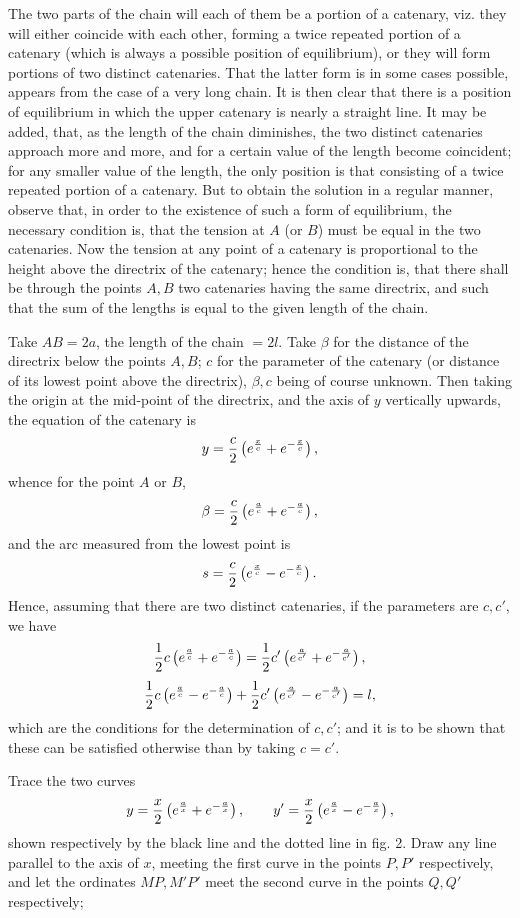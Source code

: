 \documentclass[11pt,a4paper]{article}
\theoremstyle{plain}
\theoremstyle{definition}
\begin{document}
The two parts of the chain will each of them be a portion of a catenary, viz. they will either coincide with each other, forming a twice repeated portion of a catenary (which is always a possible position of equilibrium), or they will form portions of two distinct catenaries. That the latter form is in some cases possible, appears from the case of a very long chain. It is then clear that there is a position of equilibrium in which the upper catenary is nearly a straight line. It may be added, that, as the length of the chain diminishes, the two distinct catenaries approach more and more, and for a certain value of the length become coincident; for any smaller value of the length, the only position is that consisting of a twice repeated portion of a catenary. But to obtain the solution in a regular manner, observe that, in order to the existence of such a form of equilibrium, the necessary condition is, that the tension at $A$ (or $B$) must be equal in the two catenaries. Now the tension at any point of a catenary is proportional to the height above the directrix of the catenary; hence the condition is, that there shall be through the points $A,B$ two catenaries having the same directrix, and such that the sum of the lengths is equal to the given length of the chain.

Take $AB=2a$, the length of the chain $=2l$. Take $\beta$ for the distance of the directrix below the points $A,B$; $c$ for the parameter of the catenary (or distance of its lowest point above the directrix), $\beta,c$ being of course unknown. Then taking the origin at the mid-point of the directrix, and the axis of $y$ vertically upwards, the equation of the catenary is
\[
y={c\over2}\left(e^{x\over c}+e^{-{x\over c}}\right),
\]
whence for the point $A$ or $B$,
\[
\beta={c\over2}\left(e^{a\over c}+e^{-{a\over c}}\right),
\]
and the arc measured from the lowest point is
\[
s={c\over2}\left(e^{x\over c}-e^{-{x\over c}}\right).
\]
Hence, assuming that there are two distinct catenaries, if the parameters are $c,c'$, we have
\[
{1\over2}c\left(e^{a\over c}+e^{-{a\over c}}\right)
={1\over2}c'\left(e^{a\over c'}+e^{-{a\over c'}}\right),
\]
\[
{1\over2}c\left(e^{a\over c}-e^{-{a\over c}}\right)
+{1\over2}c'\left(e^{a\over c'}-e^{-{a\over c'}}\right)=l,
\]
which are the conditions for the determination of $c,c'$; and it is to be shown that these can be satisfied otherwise than by taking $c=c'$.

\newpage

Trace the two curves
\[
y={x\over2}\left(e^{a\over x}+e^{-{a\over x}}\right),\qquad
y'={x\over2}\left(e^{a\over x}-e^{-{a\over x}}\right),
\]
shown respectively by the black line and the dotted line in fig. 2. Draw any line parallel to the axis of $x$, meeting the first curve in the points $P,P'$ respectively, and let the ordinates $MP,M'P'$ meet the second curve in the points $Q,Q'$ respectively;
\end{document}
